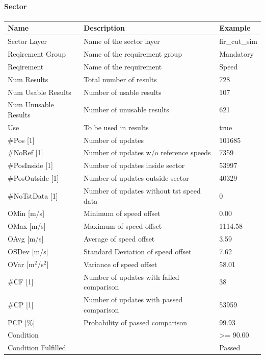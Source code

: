 \paragraph{Sector}

\begin{center}
 \begin{table}[H]
  \begin{tabularx}{\textwidth}{ | l | X |  l | }
    \hline
    \textbf{Name} & \textbf{Description} & \textbf{Example} \\ \hline
    Sector Layer & Name of the sector layer & fir\_cut\_sim \\ \hline
    Reqirement Group & Name of the requirement group & Mandatory \\ \hline
    Reqirement & Name of the requirement & Speed \\ \hline
    Num Results & Total number of results & 728 \\ \hline
    Num Usable Results & Number of usable results & 107 \\ \hline
    Num Unusable Results & Number of unusable results & 621 \\ \hline
    Use & To be used in results & true \\ \hline
    \#Pos [1] & Number of updates & 101685 \\ \hline
    \#NoRef [1] & Number of updates w/o reference speeds & 7359 \\ \hline
    \#PosInside [1] & Number of updates inside sector & 53997 \\ \hline
    \#PosOutside [1] & Number of updates outside sector & 40329 \\ \hline
    \#NoTstData [1] & Number of updates without tst speed data & 0 \\ \hline
    OMin [m/s] & Minimum of speed offset & 0.00 \\ \hline
    OMax [m/s] & Maximum of speed offset & 1114.58 \\ \hline
    OAvg [m/s] & Average of speed offset & 3.59 \\ \hline
    OSDev [m/s] & Standard Deviation of speed offset & 7.62 \\ \hline
    OVar [m$^2$/s$^2$] & Variance of speed offset & 58.01 \\ \hline
    \#CF [1] & Number of updates with failed comparison & 38 \\ \hline
    \#CP [1] & Number of updates with passed comparison  & 53959 \\ \hline
    PCP [\%] & Probability of passed comparison & 99.93 \\ \hline
    Condition &  & >= 90.00 \\ \hline
    Condition Fulfilled &  & Passed \\ \hline
\end{tabularx}
\end{table}
\end{center}

